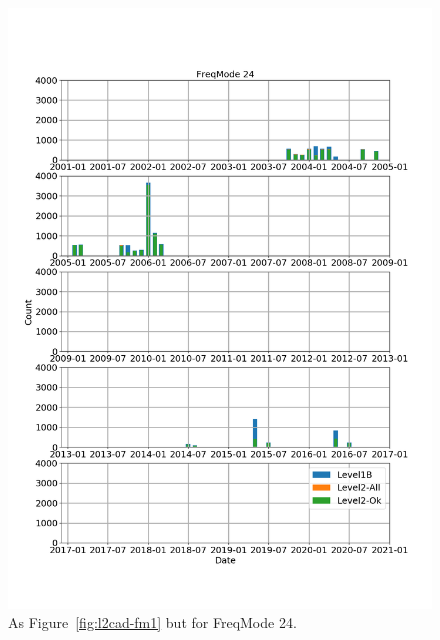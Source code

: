 \begin{figure}[t]
\centering
\includegraphics[width=1.0\textwidth]{l2cad-fm24.png}
\caption{As Figure~\ref{fig:l2cad-fm1} but for FreqMode 24.}
\label{fig:l2cad-fm24}
\end{figure}
